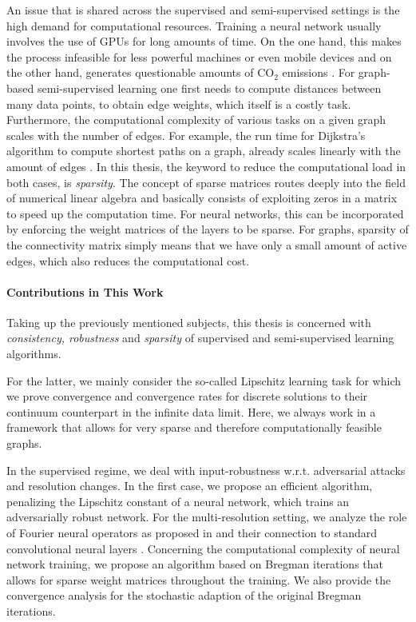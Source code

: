 An issue that is shared across the supervised and semi-supervised settings is the high demand for computational resources. Training a neural network usually involves the use of GPUs for long amounts of time. On the one hand, this makes the process infeasible for less powerful machines or even mobile devices and on the other hand, generates questionable amounts of $\mathrm{CO_2}$ emissions \cite{hoefler2021sparsity}. For graph-based semi-supervised learning one first needs to compute distances between many data points, to obtain edge weights, which itself is a costly task. Furthermore, the computational complexity of various tasks on a given graph scales with the number of edges. For example, the run time for Dijkstra's algorithm to compute shortest paths on a graph, already scales linearly with the amount of edges \cite{dijkstra2022note}. In this thesis, the keyword to reduce the computational load in both cases, is \textit{sparsity}. The concept of sparse matrices routes deeply into the field of numerical linear algebra \cite{lanczos1952solution,golub2013matrix} and basically consists of exploiting zeros in a matrix to speed up the computation time. For neural networks, this can be incorporated by enforcing the weight matrices of the layers to be sparse. For graphs, sparsity of the connectivity matrix simply means that we have only a small amount of active edges, which also reduces the computational cost.
%
%
\paragraph{Contributions in This Work}
%
Taking up the previously mentioned subjects, this thesis is concerned with \textit{consistency, robustness} and \textit{sparsity} of supervised and semi-supervised learning algorithms. 

For the latter, we mainly consider the so-called Lipschitz learning task \cite{nadler2009statistical} for which we prove convergence and convergence rates for discrete solutions to their continuum counterpart in the infinite data limit. Here, we always work in a framework that allows for very sparse and therefore computationally feasible graphs.

In the supervised regime, we deal with input-robustness w.r.t. adversarial attacks and resolution changes. In the first case, we propose an efficient algorithm, penalizing the Lipschitz constant \cite{lipschitz1877lehrbuch} of a neural network, which trains an adversarially robust network. For the multi-resolution setting, we analyze the role of Fourier neural operators as proposed in \cite{li2020fourier} and their connection to standard convolutional neural layers \cite{fukushima1980neocognitron}. Concerning the computational complexity of neural network training, we propose an algorithm based on Bregman iterations \cite{osher2005iterative} that allows for sparse weight matrices throughout the training. We also provide the convergence analysis for the stochastic adaption of the original Bregman iterations.

